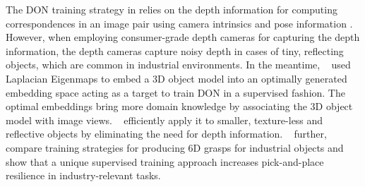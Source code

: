 The DON training strategy in \cite{florence2018dense} relies on the depth information for computing correspondences in an image pair using
camera intrinsics and pose information \cite{hartley2003multiple}.
However, when employing consumer-grade depth cameras for capturing the depth information,
the depth cameras capture noisy depth in cases of tiny, reflecting objects, which are common in
industrial environments. In the meantime, \citeauthor{kupcsik2021supervised}~\cite{kupcsik2021supervised} used Laplacian Eigenmaps \cite{belkin2003laplacian}
to embed a 3D object model into an optimally generated embedding space acting as a target to train DON in a supervised fashion.
The optimal embeddings bring more domain knowledge by associating the 3D object model with image views.
\citeauthor{kupcsik2021supervised}~\cite{kupcsik2021supervised} efficiently apply it to smaller, texture-less and
reflective objects by eliminating the need for depth information. \citeauthor{kupcsik2021supervised}~\cite{kupcsik2021supervised}
further, compare training strategies for producing 6D grasps for industrial objects and show that a unique supervised training approach
increases pick-and-place resilience in industry-relevant tasks.


